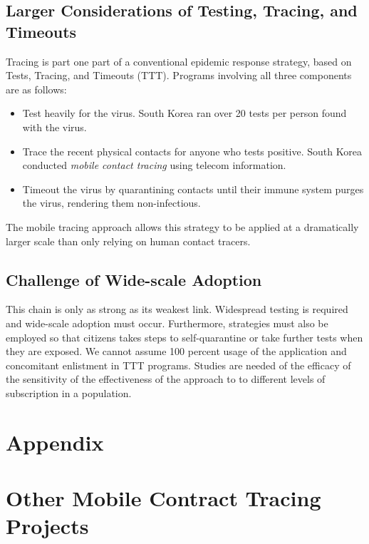 \documentclass{article}
\begin{document}

\subsection{Larger Considerations of Testing, Tracing, and Timeouts}
Tracing is part one part of a conventional epidemic response strategy, based on Tests, Tracing, and Timeouts (TTT). Programs involving all three components are as follows:
\begin{itemize}
\item Test heavily for the virus.  South Korea ran over 20 tests per person found with the virus. 
\item Trace the recent physical contacts for anyone who tests positive.  South Korea conducted \emph{mobile contact tracing} using telecom information.
\item Timeout the virus by quarantining contacts until their immune system purges the virus, rendering them non-infectious.
\end{itemize}
The mobile tracing approach allows this strategy to be applied at a dramatically larger scale than only relying on human contact tracers.  

\subsection{Challenge of Wide-scale Adoption}
This chain is only as strong as its weakest link.  Widespread testing is required and wide-scale adoption must occur. Furthermore, strategies must also be employed so that citizens takes steps to self-quarantine or take further tests when they are exposed. We cannot assume 100 percent usage of the application and concomitant enlistment in TTT programs.  Studies are needed of the efficacy of the sensitivity of the effectiveness of the approach to to different levels of subscription in a population.

\newpage
\appendix

\section*{Appendix}

\section{Other Mobile Contract Tracing Projects}\label{sect:apps}
\end{document}
